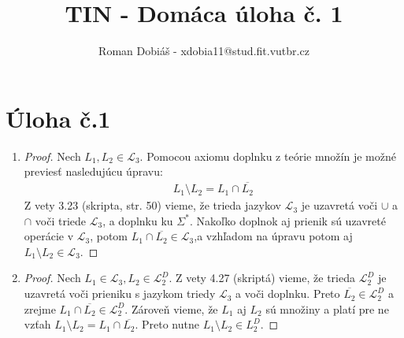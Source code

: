 \documentclass[10pt]{article}
\begin{document}
 
 
 
\title{TIN - Domáca úloha č. 1}%
\author{Roman Dobiáš - xdobia11@stud.fit.vutbr.cz}
 
\maketitle

\section*{Úloha č.1}
\begin{enumerate}
\item 
    \begin{proof}
    Nech $L_1, L_2 \in \mathcal{L}_3$. 
    Pomocou axiomu doplnku z teórie množín je možné previesť nasledujúcu úpravu:
        \begin{align*}
            L_1 \setminus L_2 = L_1 \cap \overline{L_2}
        \end{align*}
    Z vety 3.23 (skripta, str. 50) vieme, že trieda jazykov $\mathcal{L}_3$ je uzavretá voči
    $\cup$ a $\cap$ voči triede $\mathcal{L}_3$, a doplnku ku $\Sigma^{*}$.
            Nakoľko doplnok aj prienik sú uzavreté operácie v $\mathcal{L}_3$, potom $L_1 \cap
    \overline{L_2} \in \mathcal{L}_3$,a vzhľadom na úpravu potom aj $L_1 \setminus L_2 \in
    \mathcal{L}_3$. 
    \end{proof}
\item 
    \begin{proof}
        Nech $L_1 \in \mathcal{L}_3, L_2 \in \mathcal{L}_2^D$. Z vety 4.27 (skriptá) vieme, že trieda
        $\mathcal{L}_2^D$ je uzavretá voči prieniku s jazykom triedy $\mathcal{L}_3$ a voči
        doplnku. 
        Preto $\overline{L_2} \in \mathcal{L}_2^D$ a zrejme $L_1 \cap \overline{L_2} \in
        \mathcal{L}_2^D$. Zároveň vieme, že $L_1$ aj $L_2$ sú množiny a platí pre ne vzťah $L_1
        \setminus L_2 = L_1\cap \overline{L_2}$. Preto nutne $L_1\setminus L_2 \in L_2^D$.
    \end{proof}


\end{enumerate}
\end{document}
